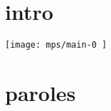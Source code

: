 \documentclass[11pt]{article}
\begin{document}
\section*{intro}
      \texttt{[image:  mps/main-0 ]}

\newpage

\section*{paroles}

\end{document}

